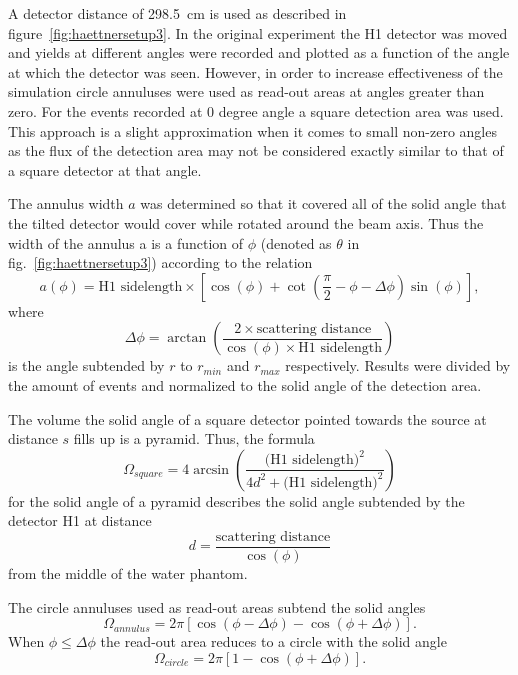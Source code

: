 A detector distance of 298.5~cm is used as described in figure~\ref{fig:haettnersetup3}. In the original experiment the H1 detector was moved and yields at different angles were recorded and plotted as a function of the angle at which the detector was seen. However, in order to increase effectiveness of the simulation circle annuluses were used as read-out areas at angles greater than zero. For the events recorded at 0 degree angle a square detection area was used. This approach is a slight approximation when it comes to small non-zero angles as the flux of the detection area may not be considered exactly similar to that of a square detector at that angle.

The annulus width $a$ was determined so that it covered all of the solid angle that the tilted detector would cover while rotated around the beam axis. Thus the width of the annulus a is a function of $\phi$ (denoted as $\theta$ in fig.~\ref{fig:haettnersetup3}) according to the relation \begin{equation}a(\phi) = \text{H1 sidelength} \times [\cos(\phi)+ \cot(\frac{\pi}{2} - \phi - \Delta\phi)\sin(\phi)],\end{equation}where \begin{equation}\Delta\phi = \arctan\left(\frac{2 \times \text{scattering distance}}{\cos(\phi) \times \text{H1 sidelength}}\right)\end{equation} is the angle subtended by $r$ to $r_{min}$ and $r_{max}$ respectively.
Results were divided by the amount of events and normalized to the solid angle of the detection area.

The volume the solid angle of a square detector pointed towards the source at distance $s$ fills up is a pyramid. Thus, the formula \begin{equation}\Omega_{square} = 4 \arcsin\left(\frac{\text{(H1 sidelength)}^2}{4d^2+\text{(H1 sidelength)}^2}\right)\end{equation}for the solid angle of a pyramid describes the solid angle subtended by the detector H1 at distance \begin{equation}d = \frac{\text{scattering distance}}{\cos(\phi)}\end{equation}from the middle of the water phantom.

The circle annuluses used as read-out areas subtend the solid angles \begin{equation}\Omega_{annulus} = 2 \pi [\cos(\phi - \Delta\phi) - \cos(\phi + \Delta\phi)].\end{equation}When $\phi \le \Delta\phi$ the read-out area reduces to a circle with the solid angle \begin{equation}\Omega_{circle} = 2 \pi [1 - \cos(\phi + \Delta\phi)].\end{equation}

